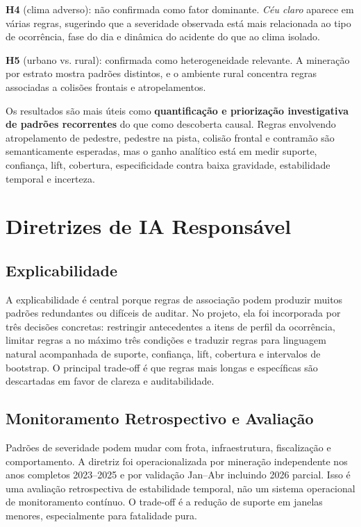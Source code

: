 \documentclass[12pt]{article}
\begin{document}
\textbf{H4} (clima adverso): não confirmada como fator dominante. \textit{Céu claro} aparece em várias regras, sugerindo que a severidade observada está mais relacionada ao tipo de ocorrência, fase do dia e dinâmica do acidente do que ao clima isolado.

\textbf{H5} (urbano vs. rural): confirmada como heterogeneidade relevante. A mineração por estrato mostra padrões distintos, e o ambiente rural concentra regras associadas a colisões frontais e atropelamentos.

Os resultados são mais úteis como \textbf{quantificação e priorização investigativa de padrões recorrentes} do que como descoberta causal. Regras envolvendo atropelamento de pedestre, pedestre na pista, colisão frontal e contramão são semanticamente esperadas, mas o ganho analítico está em medir suporte, confiança, lift, cobertura, especificidade contra baixa gravidade, estabilidade temporal e incerteza.

\section{Diretrizes de IA Responsável}

\subsection{Explicabilidade}

A explicabilidade é central porque regras de associação podem produzir muitos padrões redundantes ou difíceis de auditar. No projeto, ela foi incorporada por três decisões concretas: restringir antecedentes a itens de perfil da ocorrência, limitar regras a no máximo três condições e traduzir regras para linguagem natural acompanhada de suporte, confiança, lift, cobertura e intervalos de bootstrap. O principal trade-off é que regras mais longas e específicas são descartadas em favor de clareza e auditabilidade.

\subsection{Monitoramento Retrospectivo e Avaliação}

Padrões de severidade podem mudar com frota, infraestrutura, fiscalização e comportamento. A diretriz foi operacionalizada por mineração independente nos anos completos 2023--2025 e por validação Jan--Abr incluindo 2026 parcial. Isso é uma avaliação retrospectiva de estabilidade temporal, não um sistema operacional de monitoramento contínuo. O trade-off é a redução de suporte em janelas menores, especialmente para fatalidade pura.
\end{document}
